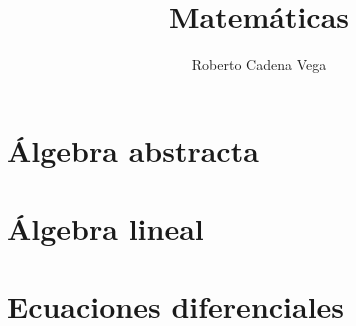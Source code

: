 



\title{Matemáticas}
\author{Roberto Cadena Vega}



    \maketitle

    \tableofcontents
    \listoftodos

    \clearpage
    \chapter{Álgebra abstracta}
    

    \clearpage
    \chapter{Álgebra lineal}
    

    \clearpage
    \chapter{Ecuaciones diferenciales}
    



